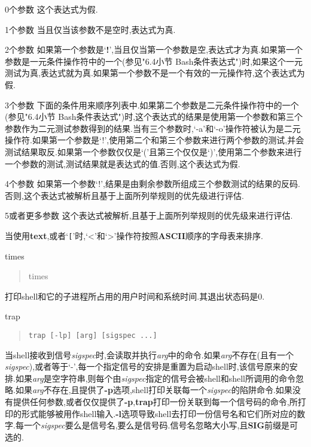 \documentclass[draft,openany]{book}
\begin{document}
\begin{CJK}{UTF8}{gbsn}
\begin{basedescript}{\desclabelstyle{\nextlinelabel}\desclabelwidth{2.5em}}
        \begin{basedescript}{\desclabelstyle{\nextlinelabel}\desclabelwidth{2.5em}}
            \item[0个参数] 这个表达式为假.
            \item[1个参数] 当且仅当该参数不是空时,表达式为真.
            \item[2个参数] 如果第一个参数是`\textbf{!}',当且仅当第一个参数是空,表达式才为真.如果第一个参数是一元条件操作符中的一个(参见"6.4小节 Bash条件表达式")时,如果这个一元测试为真,表达式就为真.如果第一个参数不是一个有效的一元操作符,这个表达式为假.
            \item[3个参数] 下面的条件用来顺序列表中.如果第二个参数是二元条件操作符中的一个(参见"6.4小节 Bash条件表达式")时,这个表达式的结果是使用第一个参数和第三个参数作为二元测试参数得到的结果.当有三个参数时,`-a'和`-o'操作符被认为是二元操作符.如果第一个参数是`!',使用第二个和第三个参数来进行两个参数的测试,并会测试结果取反.如果第一个参数仅仅是`('且第三个仅仅是`)',使用第二个参数来进行一个参数的测试,测试结果就是表达式的值.否则,这个表达式为假.
            \item[4个参数] 如果第一个参数`!',结果是由剩余参数所组成三个参数测试的结果的反码.否则,这个表达式被解析且基于上面所列举规则的优先级进行评估.
            \item[5或者更多参数] 这个表达式被解析,且基于上面所列举规则的优先级来进行评估.
        \end{basedescript}
        当使用\textbf{text},或者`\verb+[+'时,`\textless'和`\textgreater'操作符按照\textbf{ASCII}顺序的字母表来排序.
        \item[times]
            \begin{quote}
                times
            \end{quote}
            打印shell和它的子进程所占用的用户时间和系统时间.其退出状态码是0.
        \item[trap]
            \begin{quote}
                \verb+trap [-lp] [arg] [sigspec ...]+
            \end{quote}
            当shell接收到信号\emph{sigspec}时,会读取并执行\emph{arg}中的命令.如果\emph{arg}不存在(且有一个\emph{sigspec}),或者等于`-',每一个指定信号的安排是重置为启动shell时,该信号原来的安排.如果\emph{arg}是空字符串,则每个由\emph{sigspec}指定的信号会被shell和shell所调用的命令忽略.如果\emph{arg}不存在,且提供了\textbf{-p}选项,shell打印关联每一个\emph{sigspec}的陷阱命令.如果没有提供任何参数,或者仅仅提供了\textbf{-p},\textbf{trap}打印一份关联到每一个信号码的命令,所打印的形式能够被用作shell输入.\textbf{-l}选项导致shell去打印一份信号名和它们所对应的数字.每一个\emph{sigspec}要么是信号名,要么是信号码.信号名忽略大小写,且\textbf{SIG}前缀是可选的.\par

\end{basedescript}
\end{CJK}
\end{document}
